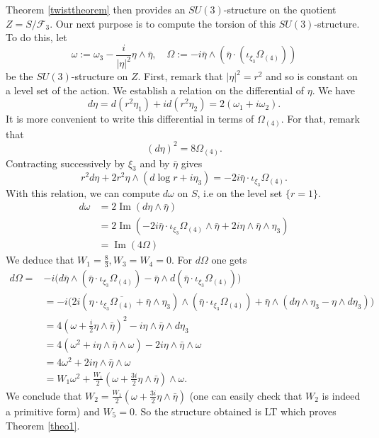 \documentclass[12pt, reqno]{amsart}
\theoremstyle{definition}
\DeclareMathOperator\Ima{Im}
\begin{document}
Theorem \ref{twisttheorem} then provides an $SU(3)$-structure on the quotient $Z=S/\mathcal{F}_3$. Our next purpose is to compute the torsion of this $SU(3)$-structure. To do this, let $$\omega:=\omega_3-\frac{i}{|\eta|^2}\eta\wedge\bar\eta,\,\, ~~~\Omega:=-i\bar\eta\wedge(\bar\eta\cdot(\iota_{\xi_3}\Omega_{(4)}))$$ be the $SU(3)$-structure on $Z$.
First, remark that $|\eta|^2=r^2$ and so is constant on a level set of the action. We establish a relation on the differential of $\eta$. We have
$$d\eta=d(r^2\eta_1)+id(r^2\eta_2)=2(\omega_1+i\omega_2).$$ It is more convenient to write this differential in terms of $\Omega_{(4)}$. For that, remark that $$(d\eta)^2=8\Omega_{(4)}.$$ Contracting successively by $\xi_3$ and by $\bar\eta$ gives 
$$r^2d\eta+2r^2\eta\wedge(d\log r+i\eta_3) =-2i\bar\eta\cdot\iota_{\xi_3}\Omega_{(4)}.$$ With this relation, we can compute $d\omega$ on $S$, i.e on the level set $\{r=1\}$. 
\begin{align*}
    d\omega&=2\Ima(d\eta\wedge\bar\eta)\\
    &=2\Ima(-2i\bar\eta\cdot\iota_{\xi_3}\Omega_{(4)}\wedge\bar\eta+2i\eta\wedge\bar\eta\wedge\eta_3)\\
    &=\Ima(4\Omega)
\end{align*}
We deduce that $W_1=\frac{8}{3},W_3=W_4=0$. For $d\Omega$ one gets
\begin{align*}
    d\Omega=&-i\bigg(d\bar\eta\wedge(\bar\eta\cdot\iota_{\xi_3}\Omega_{(4)})-\bar\eta\wedge d(\bar\eta\cdot\iota_{\xi_3}\Omega_{(4)})\bigg)\\
    &=-i\bigg(2i(\eta\cdot\iota_{\xi_3}\overline{\Omega_{(4)}}+\bar\eta\wedge\eta_3)\wedge(\bar\eta\cdot\iota_{\xi_3}\Omega_{(4)})+\bar\eta\wedge(d\eta\wedge\eta_3-\eta\wedge d\eta_3)\bigg)\\
    &=4(\omega+\frac{i}{2}\eta\wedge\bar\eta)^2-i\eta\wedge\bar\eta\wedge d\eta_3\\
    &=4(\omega^2+i\eta\wedge\bar\eta\wedge\omega)-2i\eta\wedge\bar\eta\wedge\omega\\
    &=4\omega^2+2i\eta\wedge\bar\eta\wedge\omega\\
    &=W_1\omega^2+\frac{W_1}{2}(\omega+\frac{3i}{2}\eta\wedge\bar\eta)\wedge\omega.
\end{align*}
We conclude that $W_2=\frac{W_1}{2}(\omega+\frac{3i}{2}\eta\wedge\bar\eta)$ (one can easily check that $W_2$ is indeed a primitive form) and $W_5=0$. So the structure obtained is LT which proves Theorem \ref{theo1}. \\ 
\end{document}
